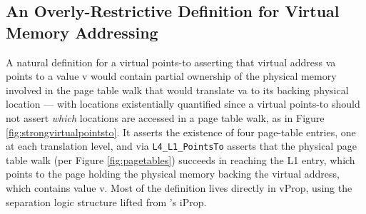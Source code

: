 \subsection{An Overly-Restrictive Definition for Virtual Memory Addressing}
\label{sec:overly-restrictive}
A natural definition for a virtual points-to
asserting that virtual address \textsf{va} points to a value \textsf{v}
would 
contain
partial ownership of the physical memory involved in the page table walk that would translate \textsf{va} to
its backing physical location --- with locations existentially quantified since a virtual points-to should not assert
\emph{which} locations are accessed in a page table walk, as in Figure \ref{fig:strongvirtualpointsto}.
It asserts the existence of four page-table entries, one at each translation level, and via \lstinline|L4_L1_PointsTo|
asserts that the physical page table walk (per Figure \ref{fig:pagetables}) succeeds in reaching the L1 entry,
which points to the page holding the physical memory backing the virtual address, which contains value \textsf{v}.
Most of the definition lives directly in \textsf{vProp}, using the separation logic structure lifted from \iris's \textsf{iProp}.


